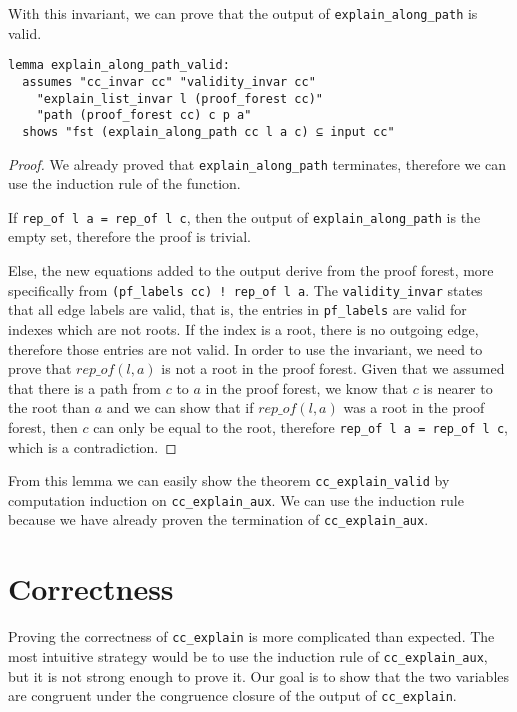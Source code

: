 With this invariant, we can prove that the output of \lstinline{explain_along_path} is valid.

\begin{lstlisting}
lemma explain_along_path_valid:
  assumes "cc_invar cc" "validity_invar cc"
    "explain_list_invar l (proof_forest cc)"
    "path (proof_forest cc) c p a"
  shows "fst (explain_along_path cc l a c) ⊆ input cc"
\end{lstlisting}

\begin{proof}
We already proved that \lstinline{explain_along_path} terminates, therefore we can use the induction rule of the function.

If \lstinline{rep_of l a = rep_of l c}, then the output of \lstinline{explain_along_path} is the empty set, therefore the proof is trivial.

Else, the new equations added to the output derive from the proof forest, more specifically from \lstinline{(pf_labels cc) ! rep_of l a}.
The \lstinline{validity_invar} states that all edge labels are valid, that is, the entries in \lstinline|pf_labels| are valid for indexes which are not roots. If the index is a root, there is no outgoing edge, therefore those entries are not valid.
In order to use the invariant, we need to prove that $rep\_of(l, a)$ is not a root in the proof forest.
Given that we assumed that there is a path from $c$ to $a$ in the proof forest, we know that $c$ is nearer to the root than $a$ and we can show that if $rep\_of(l,a)$ was a root in the proof forest, then $c$ can only be equal to the root, therefore \lstinline{rep_of l a = rep_of l c}, which is a contradiction.
\end{proof}

From this lemma we can easily show the theorem \lstinline{cc_explain_valid} by computation induction on \lstinline{cc_explain_aux}. We can use the induction rule because we have already proven the termination of \lstinline{cc_explain_aux}.

\section{Correctness}

Proving the correctness of \lstinline{cc_explain} is more complicated than expected. The most intuitive strategy would be to use the induction rule of \lstinline{cc_explain_aux}, but it is not strong enough to prove it. Our goal is to show that the two variables are congruent under the congruence closure of the output of \lstinline{cc_explain}.

